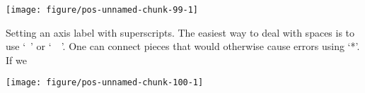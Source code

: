 \documentclass[paper=a4,10pt,div=17,headsepline,BCOR=12mm,twoside,open=right]{scrbook}\usepackage{knitr}
\begin{document}
\begin{knitrout}\footnotesize
{}\color{fgcolor}\begin{kframe}
\begin{alltt}
 \hlkwb{<-}
  \hlstd{(} \hlstd{=} \hlopt{:}\hlstd{,}  \hlstd{=} \hlstd{(}\hlstd{,} \hlstd{),}
              \hlstd{=} \hlstd{(}\hlstr{"alpha["}\hlstd{,} \hlopt{:}\hlstd{,} \hlstr{"]"}\hlstd{,}  \hlstd{=} \hlstd{))}
\hlopt{$} \hlkwb{<-} \hlstd{(}\hlstr{"alpha["}\hlopt{$} \hlstr{"]"}\hlstd{,} \hlstd{=}\hlstd{)}
 \hlkwb{<-}   \hlopt{+}
   \hlstd{(}\hlstd{=}\hlstd{,} \hlstd{=}\hlstd{,} \hlstd{=}\hlstd{)} \hlopt{+} \hlstd{())}
\end{alltt}
\end{kframe}

{\centering \texttt{[image: figure/pos-unnamed-chunk-99-1]} 

}



\end{knitrout}

Setting an axis label with superscripts. The easiest way to deal with spaces is to use `~' or `~~'. One can connect pieces that would otherwise cause errors using `*'. If we

\begin{knitrout}\footnotesize
{}\color{fgcolor}\begin{kframe}
\begin{alltt}
 \hlopt{+} \hlstd{(}\hlstd{=} \hlstd{=}\hlopt{~~}\hlopt{~}\hlopt{^}\hlstd{\{}\hlopt{-}\hlstd{\})))}
\end{alltt}
\end{kframe}

{\centering \texttt{[image: figure/pos-unnamed-chunk-100-1]} 

}



\end{knitrout}
\end{document}

